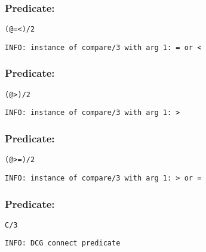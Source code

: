 \subsubsection{Predicate:} \label{V64WV61WV60WV95W2}

\begin{verbatim}
(@=<)/2
\end{verbatim}

{\small \begin{verbatim}
INFO: instance of compare/3 with arg 1: = or <

\end{verbatim}}

\subsubsection{Predicate:} \label{V64WV62WV95W2}

\begin{verbatim}
(@>)/2
\end{verbatim}

{\small \begin{verbatim}
INFO: instance of compare/3 with arg 1: >

\end{verbatim}}

\subsubsection{Predicate:} \label{V64WV62WV61WV95W2}

\begin{verbatim}
(@>=)/2
\end{verbatim}

{\small \begin{verbatim}
INFO: instance of compare/3 with arg 1: > or =

\end{verbatim}}

\subsubsection{Predicate:} \label{CV95W3}

\begin{verbatim}
C/3
\end{verbatim}

{\small \begin{verbatim}
INFO: DCG connect predicate

\end{verbatim}}
